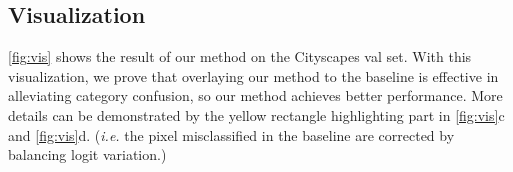 %




\subsection{Visualization}
\cref{fig:vis} shows the result of our method on the Cityscapes val set.
%
With this visualization, we prove that overlaying our method to the baseline is effective in alleviating category confusion, so our method achieves better performance.
%
More details can be demonstrated by the yellow rectangle highlighting part in \cref{fig:vis}c and \cref{fig:vis}d. (\textit{i.e.} the pixel misclassified in the baseline are corrected by balancing logit variation.)
%
